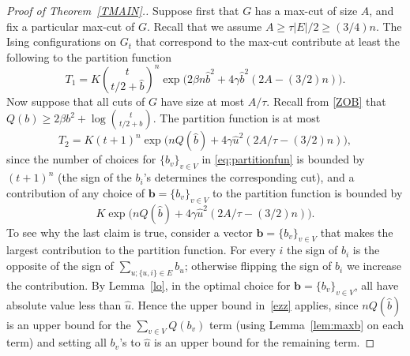 \documentclass[11pt]{article}
\begin{document}
\begin{proof}[Proof of Theorem~\ref{TMAIN}.]
Suppose first that $G$ has a max-cut of size $A$, and fix a particular max-cut of $G$. Recall that we assume $A\geq \tau|E|/2\geq (3/4) n$. The 
Ising configurations on $G_t$ that correspond to the max-cut contribute at least the following to the partition function 
\begin{equation}\label{COMAX}
T_1 = K{t\choose t/2+\hat{b}}^n \exp\Big( 2\beta n \hat{b}^2 + 4 \gamma  \hat{b}^2 (2 A - (3/2)n)\Big).
\end{equation}
Now suppose that all cuts of $G$ have size at most $ A/\tau$. Recall from \eqref{ZOB}  that $Q(b)\geq  2\beta b^2 + \log {t\choose t/2 + b}$. The partition function is at most
\begin{equation}\label{COTAU}
T_2 = K(t+1)^n \exp\Big(n Q(\hat{b})+ 4 \gamma  \hat{u}^2 (2 A/\tau - (3/2)n)\Big),
\end{equation}
since the number of choices for $\{b_v\}_{v\in V}$ in \eqref{eq:partitionfun} is bounded by $(t+1)^n$ (the sign of the $b_i$'s 
determines the corresponding cut),  and  a contribution of any choice of $\mathbf{b}=\{b_v\}_{v\in V}$ to the partition function is bounded by
\begin{equation}\label{ezz}
K\exp\Big(n Q(\hat{b})+ 4 \gamma  \hat{u}^2 (2 A/\tau - (3/2)n)\Big).
\end{equation}
To see why the last claim is true, consider a vector $\mathbf{b}=\{b_v\}_{v\in V}$  that makes the 
largest contribution to the partition function. For every $i$ the sign of $b_i$ is the opposite of the sign 
of $\sum_{u;\{u,i\}\in E}b_u$; otherwise flipping the sign of $b_i$ we increase the contribution. By
Lemma~\ref{lo}, in the optimal choice for $\mathbf{b}=\{b_v\}_{v\in V}$, all have absolute value less than $\hat{u}$. 
Hence  the upper bound in~\eqref{ezz} applies, since $nQ(\hat{b})$ is an upper bound for the 
$\sum_{v\in V} Q(b_v)$  term (using Lemma~\ref{lem:maxb} on each term) and setting all $b_v$'s to $\hat{u}$ is an upper bound for the remaining term.







\end{proof}
\end{document}
